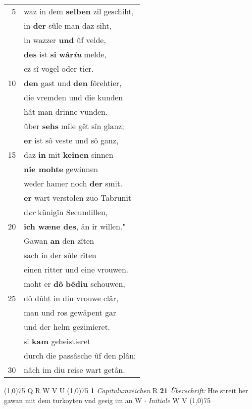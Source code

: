 \documentclass[8pt,a4paper,notitlepage]{article}
\begin{document}
\begin{table}[ht]
\begin{minipage}[t]{0.5\linewidth}
\begin{tabular}{rl}
5 & waz in dem \textbf{selben} zil geschiht,\\ 
 & in \textbf{der} sûle man daz siht,\\ 
 & in wazzer \textbf{und} ûf velde,\\ 
 & \textbf{des} ist \textbf{si} \textbf{wâr\textit{iu}} melde,\\ 
 & ez sî vogel oder tier.\\ 
10 & \textbf{den} gast und \textbf{den} fôrehtier,\\ 
 & die vremden und die kunden\\ 
 & hât man drinne vunden.\\ 
 & über \textbf{sehs} mîle gêt sîn glanz;\\ 
 & \textbf{er} ist sô veste und sô ganz,\\ 
15 & daz \textbf{in} mit \textbf{keinen} sinnen\\ 
 & \textbf{nie mohte} gewinnen\\ 
 & weder hamer noch \textbf{der} smit.\\ 
 & \textbf{er} wart verstolen zuo Tabrunit\\ 
 & d\textit{er} künigîn Secundillen,\\ 
20 & \textbf{ich wæne des}, ân ir willen."\\ 
 & Gawan \textbf{an} den zîten\\ 
 & sach in der sûle rîten\\ 
 & einen ritter und eine vrouwen.\\ 
 & moht er \textbf{dô} \textbf{bêdiu} schouwen,\\ 
25 & dô dûht in diu vrouwe clâr,\\ 
 & man und ros gewâpent gar\\ 
 & und der helm gezimieret.\\ 
 & si \textbf{kam} geheistieret\\ 
 & durch die passâsche ûf den plân;\\ 
30 & nâch im diu reise wart getân.\\ 
\end{tabular}
\scriptsize
\line(1,0){75} \newline
Q R W V U \newline
\line(1,0){75} \newline
\textbf{1} \textit{Capitulumzeichen} R  \textbf{21} \textit{Überschrift:} Hie streit her gawan mit dem turkoyten vnd gesig im an W   $\cdot$ \textit{Initiale} W V  \newline
\line(1,0){75} \newline

\end{minipage}
\end{table}
\end{document}
